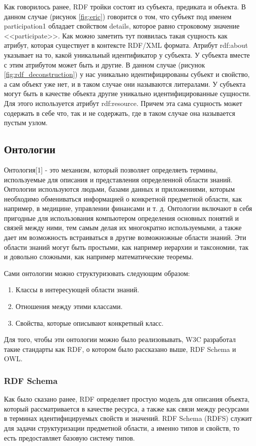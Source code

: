 \documentclass[12pt]{article}
\begin{document}
Как говорилось ранее, RDF тройки состоят из субъекта, предиката и объекта. В данном случае (рисунок \ref{fig:eric}) говорится о том, что субъект под именем participation1 обладает свойством details, которое равно строковому значение <<participate>>. Как можно заметить тут появилась такая сущность как атрибут, которая существует в контексте RDF/XML формата. Атрибут rdf:about указывает на то, какой уникальный идентификатор у субъекта. У субъекта вместе с этим атрибутом может быть и другие. В данном случае (рисунок \ref{fig:rdf_deconstruction}) у нас уникально идентифицированы субъект и свойство, а сам объект уже нет, и в таком случае они называются литералами. У субъекта могут быть в качестве объекта другие уникально идентифицированные сущности. Для этого используется атрибут rdf:resource. Причем эта сама сущность может содержать в себе что, так и не содержать, где в таком случае она называется пустым узлом.

\subsection{Онтологии}
\qquad Онтология[1] - это механизм, который позволяет определяеть термины, используемые для описания и представления определенной области знаний. Онтологии используются людьми, базами данных и приложениями, которым необходимо обмениваться информацией о конкретной предметной области, как например, в медицине, управлении финансами и т. д. Онтологии включают в себя пригодные для использования компьютером определения основных понятий и связей между ними, тем самым делая их многократно используемыми, а также дает им возможность встраиваться в другие возможножные области знаний. Эти области знаний могут быть простыми, как например иерархии и таксономии, так и довольно сложными, как например математические теоремы.

Сами онтологии можно структуризовать следующим образом:
\begin{enumerate}
    \item Классы в интересующей области знаний.
    \item Отношения между этими классами.
    \item Свойства, которые описывают конкретный класс.
\end{enumerate}

Для того, чтобы эти онтологии можно было реализовывать, W3C разработал такие стандарты как RDF, о котором было рассказано выше, RDF Schema и OWL.

\subsubsection{RDF Schema}
\qquad Как было сказано ранее, RDF определяет простую модель для описания объекта, который рассматривается в качестве ресурса, а также как связи между ресурсами в терминах идентифицируемых свойств и значений. RDF Schema (RDFS) служит для задачи структуризации предметной области, а именно типов и свойств, то есть предоставляет базовую систему типов.\par
\end{document}
